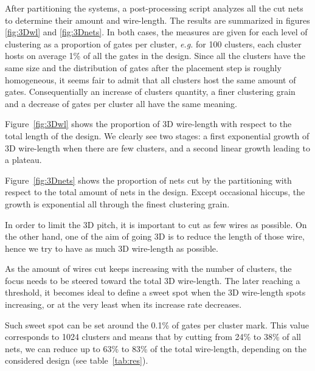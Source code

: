 \documentclass[conference]{IEEEtran}
\begin{document}
After partitioning the systems, a post-processing script analyzes all the cut nets to determine their amount and wire-length.
The results are summarized in figures \ref{fig:3Dwl} and \ref{fig:3Dnets}.
In both cases, the measures are given for each level of clustering as a proportion of gates per cluster, \textit{e.g.} for 100 clusters, each cluster hosts on average 1\% of all the gates in the design.
Since all the clusters have the same size and the distribution of gates after the placement step is roughly homogeneous, it seems fair to admit that all clusters host the same amount of gates.
Consequentially an increase of clusters quantity, a finer clustering grain and a decrease of gates per cluster all have the same meaning.

Figure~\ref{fig:3Dwl} shows the proportion of 3D wire-length with respect to the total length of the design.
We clearly see two stages: a first exponential growth of 3D wire-length when there are few clusters, and a second linear growth leading to a plateau.

Figure~\ref{fig:3Dnets} shows the proportion of nets cut by the partitioning with respect to the total amount of nets in the design.
Except occasional hiccups, the growth is exponential all through the finest clustering grain.

In order to limit the 3D pitch, it is important to cut as few wires as possible.
On the other hand, one of the aim of going 3D is to reduce the length of those wire, hence we try to have as much 3D wire-length as possible.

As the amount of wires cut keeps increasing with the number of clusters, the focus needs to be steered toward the total 3D wire-length.
The later reaching a threshold, it becomes ideal to define a sweet spot when the 3D wire-length spots increasing, or at the very least when its increase rate decreases.

Such sweet spot can be set around the 0.1\% of gates per cluster mark.
This value corresponds to 1024 clusters and means that by cutting from 24\% to 38\% of all nets, we can reduce up to 63\% to 83\% of the total wire-length, depending on the considered design (see table~\ref{tab:res}).
\end{document}
